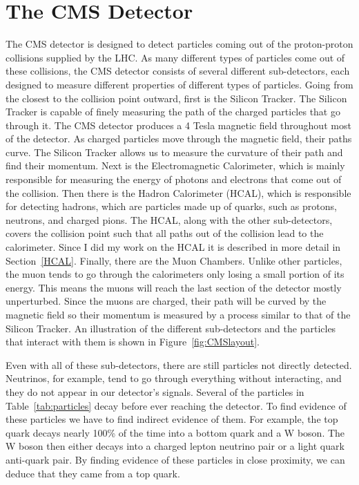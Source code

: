 \section{The CMS Detector}
The CMS detector is designed to detect particles coming out of the proton-proton collisions supplied by the LHC. As many different types of particles come out of these collisions, the CMS detector consists of several different sub-detectors, each designed to measure different properties of different types of particles. Going from the closest to the collision point outward, first is the Silicon Tracker. The Silicon Tracker is capable of finely measuring the path of the charged particles that go through it. The CMS detector produces a 4 Tesla magnetic field throughout most of the detector. As charged particles move through the magnetic field, their paths curve. The Silicon Tracker allows us to measure the curvature of their path and find their momentum. Next is the Electromagnetic Calorimeter, which is mainly responsible for measuring the energy of photons and electrons that come out of the collision. Then there is the Hadron Calorimeter (HCAL), which is responsible for detecting hadrons, which are particles made up of quarks, such as protons, neutrons, and charged pions. The HCAL, along with the other sub-detectors, covers the collision point such that all paths out of the collision lead to the calorimeter. Since I did my work on the HCAL it is described in more detail in Section~\ref{HCAL}. Finally, there are the Muon Chambers. Unlike other particles, the muon tends to go through the calorimeters only losing a small portion of its energy. This means the muons will reach the last section of the detector mostly unperturbed. Since the muons are charged, their path will be curved by the magnetic field so their momentum is measured by a process similar to that of the Silicon Tracker. An illustration of the different sub-detectors and the particles that interact with them is shown in Figure~\ref{fig:CMSlayout}.

Even with all of these sub-detectors, there are still particles not directly detected. Neutrinos, for example, tend to go through everything without interacting, and they do not appear in our detector's signals. Several of the particles in Table~\ref{tab:particles} decay before ever reaching the detector. To find evidence of these particles we have to find indirect evidence of them. For example, the top quark decays nearly 100\% of the time into a bottom quark and a W boson. The W boson then either decays into a charged lepton neutrino pair or a light quark anti-quark pair. By finding evidence of these particles in close proximity, we can deduce that they came from a top quark.

